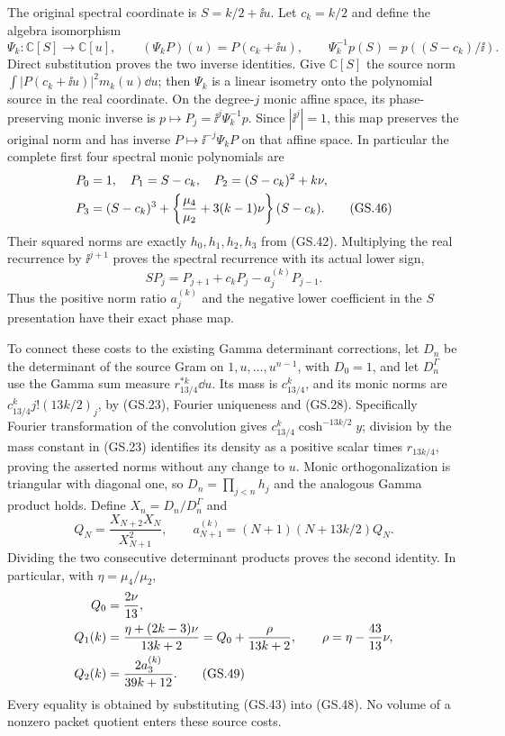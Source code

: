The original spectral coordinate is $S=k/2+\ii u$. Let $c_k=k/2$
and define the algebra isomorphism
\begin{equation}
 \Psi_k:\mathbb C[S]\longrightarrow\mathbb C[u],\qquad
 (\Psi_kP)(u)=P(c_k+\ii u),\qquad
 \Psi_k^{-1}p(S)=p((S-c_k)/\ii).\tag{GS.45}
\end{equation}
Direct substitution proves the two inverse identities. Give
$\mathbb C[S]$ the source norm
$\int|P(c_k+\ii u)|^2m_k(u)\dd u$; then $\Psi_k$ is a
linear isometry onto the polynomial source in the real coordinate.
On the degree-$j$ monic affine space, its phase-preserving monic
inverse is $p\mapsto P_j=\ii^j\Psi_k^{-1}p$.
Since $|\ii^j|=1$, this map preserves the original norm and has
inverse $P\mapsto\ii^{-j}\Psi_kP$ on that affine space. In
particular the complete first four spectral monic polynomials are
\begin{align}
 P_0&=1,\quad P_1=S-c_k,\quad P_2=(S-c_k)^2+k\nu,\notag\\
 P_3&=(S-c_k)^3+
      \left\{\frac{\mu_4}{\mu_2}+3(k-1)\nu\right\}(S-c_k).
 \tag{GS.46}
\end{align}
Their squared norms are exactly $h_0,h_1,h_2,h_3$ from (GS.42).
Multiplying the real recurrence by $\ii^{j+1}$ proves the
spectral recurrence with its actual lower sign,
\begin{equation}
 S P_j=P_{j+1}+c_kP_j-a_j^{(k)}P_{j-1}.\tag{GS.47}
\end{equation}
Thus the positive norm ratio $a_j^{(k)}$ and the negative lower
coefficient in the $S$ presentation have their exact phase map.

To connect these costs to the existing Gamma determinant corrections,
let $D_n$ be the determinant of the source Gram on $1,u,\ldots,u^{n-1}$,
with $D_0=1$, and let $D_n^\Gamma$ use the Gamma sum measure
$r_{13/4}^{*k}\dd u$. Its mass is $c_{13/4}^k$, and its monic
norms are $c_{13/4}^k j!(13k/2)_j$, by (GS.23), Fourier
uniqueness and (GS.28). Specifically Fourier transformation of
the convolution gives $c_{13/4}^k\cosh^{-13k/2}y$; division by
the mass constant in (GS.23) identifies its density as a positive
scalar times $r_{13k/4}$, proving the asserted norms without any
change to $u$. Monic orthogonalization is triangular with diagonal
one, so $D_n=\prod_{j<n}h_j$ and the analogous Gamma product
holds. Define $X_n=D_n/D_n^\Gamma$ and
\begin{equation}
 Q_N=\frac{X_{N+2}X_N}{X_{N+1}^2},\qquad
 a_{N+1}^{(k)}=(N+1)(N+13k/2)Q_N.\tag{GS.48}
\end{equation}
Dividing the two consecutive determinant products proves the second
identity. In particular, with $\eta=\mu_4/\mu_2$,
\begin{align}
 Q_0&=\frac{2\nu}{13},\notag\\
 Q_1(k)&=\frac{\eta+(2k-3)\nu}{13k+2}
        =Q_0+\frac{\rho}{13k+2},\qquad
 \rho=\eta-\frac{43}{13}\nu,\notag\\
 Q_2(k)&=\frac{2a_3^{(k)}}{39k+12}.\tag{GS.49}
\end{align}
Every equality is obtained by substituting (GS.43) into (GS.48).
No volume of a nonzero packet quotient enters these source costs.

